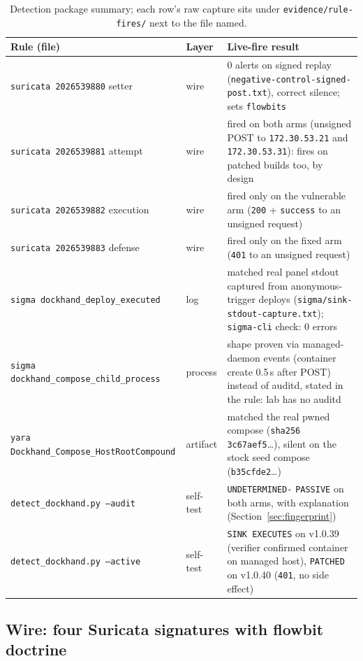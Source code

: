 \documentclass[journal]{IEEEtran}
\begin{document}
\begin{table}[t]
\centering
\footnotesize
\begin{tabular}{@{}p{4.3cm}p{1.5cm}p{9.0cm}@{}}
\toprule
Rule (file) & Layer & Live-fire result \\
\midrule
\texttt{suricata 2026539880} setter & wire & 0 alerts on signed replay
(\texttt{negative-control-signed-}\allowbreak\texttt{post.txt}), correct
silence; sets \texttt{flowbits} \\
\texttt{suricata 2026539881} attempt & wire & fired on both arms (unsigned
POST to \texttt{172.30.53.21} and \texttt{172.30.53.31}): fires on patched
builds too, by design \\
\texttt{suricata 2026539882} execution & wire & fired only on the vulnerable
arm (\texttt{200} + \texttt{success} to an unsigned request) \\
\texttt{suricata 2026539883} defense & wire & fired only on the fixed arm
(\texttt{401} to an unsigned request) \\
\texttt{sigma dockhand\_deploy\_}\allowbreak\texttt{executed} & log & matched
real panel stdout captured from anonymous-trigger deploys
(\texttt{sigma/}\allowbreak\texttt{sink-stdout-capture.txt});
\texttt{sigma-cli} check: 0 errors \\
\texttt{sigma dockhand\_compose\_}\allowbreak\texttt{child\_process} & process
& shape proven via managed-daemon events (container create 0.5\,s after POST)
instead of auditd, stated in the rule: lab has no auditd \\
\texttt{yara Dockhand\_Compose\_}\allowbreak\texttt{HostRootCompound} &
artifact & matched the real pwned compose (\texttt{sha256 3c67aef5}\ldots),
silent on the stock seed compose (\texttt{b35cfde2}\ldots) \\
\texttt{detect\_dockhand.py --audit} & self-test & \texttt{UNDETERMINED-}
\texttt{PASSIVE} on both arms, with explanation (Section~\ref{sec:fingerprint})
\\
\texttt{detect\_dockhand.py --active} & self-test & \texttt{SINK EXECUTES} on
v1.0.39 (verifier confirmed container on managed host), \texttt{PATCHED} on
v1.0.40 (\texttt{401}, no side effect) \\
\bottomrule
\end{tabular}
\caption{Detection package summary; each row's raw capture sits under
\texttt{evidence/rule-fires/} next to the file named.}
\label{tab:rules}
\end{table}

\subsection{Wire: four Suricata signatures with flowbit doctrine}
\end{document}
